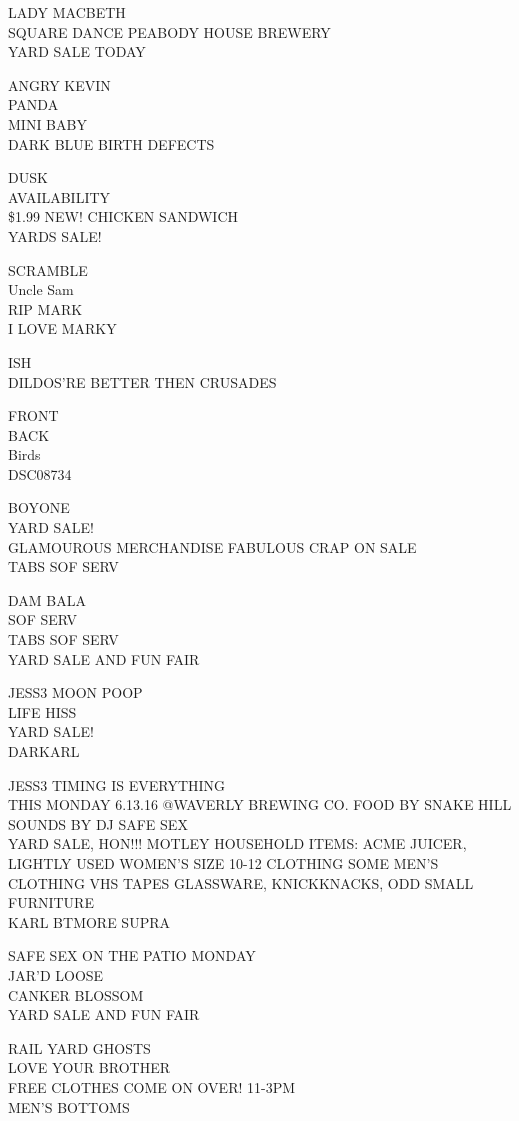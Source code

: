 \documentclass[10pt,letterpaper]{article}
\begin{document}
LADY MACBETH\\
SQUARE DANCE PEABODY HOUSE BREWERY\\
YARD SALE TODAY

ANGRY KEVIN\\
PANDA\\
MINI BABY\\
DARK BLUE BIRTH DEFECTS

DUSK\\
AVAILABILITY\\
\$1.99 NEW!  CHICKEN SANDWICH\\
YARDS SALE!

SCRAMBLE\\
Uncle Sam\\
RIP MARK\\
I LOVE MARKY

ISH\\
DILDOS'RE BETTER THEN CRUSADES

FRONT\\
BACK\\
Birds\\
DSC08734

BOYONE\\
YARD SALE!\\
GLAMOUROUS MERCHANDISE FABULOUS CRAP ON SALE\\
TABS SOF SERV

DAM BALA\\
SOF SERV\\
TABS SOF SERV\\
YARD SALE AND FUN FAIR

JESS3 MOON POOP\\
LIFE HISS\\
YARD SALE!\\
DARKARL

JESS3 TIMING IS EVERYTHING\\
THIS MONDAY 6.13.16 @WAVERLY BREWING CO. FOOD BY SNAKE HILL SOUNDS BY DJ SAFE SEX\\
YARD SALE, HON!!! MOTLEY HOUSEHOLD ITEMS: ACME JUICER, LIGHTLY USED WOMEN'S SIZE 10{-}12 CLOTHING SOME MEN'S CLOTHING VHS TAPES GLASSWARE, KNICKKNACKS, ODD SMALL FURNITURE\\
KARL BTMORE SUPRA

SAFE SEX ON THE PATIO MONDAY\\
JAR'D LOOSE\\
CANKER BLOSSOM\\
YARD SALE AND FUN FAIR

RAIL YARD GHOSTS\\
LOVE YOUR BROTHER\\
FREE CLOTHES COME ON OVER!  11{-}3PM\\
MEN'S BOTTOMS
\end{document}
